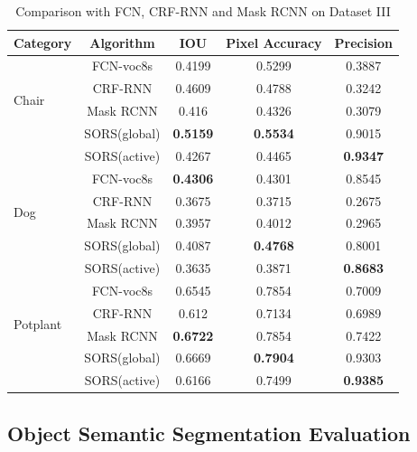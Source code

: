 \documentclass[conference]{IEEEtran}
\begin{document}
\begin{table}[htb]
	\centering
	\normalsize
	\caption{ {\color{blue}Comparison with FCN, CRF-RNN and Mask RCNN on Dataset III}}
	\label{t4}
	\begin{tabular}{lcccc}
		\hline
		Category& Algorithm& IOU& Pixel Accuracy& Precision \\
		\hline
		\multirow {4}{3cm}{Chair}&FCN-voc8s&0.4199&0.5299&0.3887\\
		
		&CRF-RNN&0.4609&0.4788&0.3242\\
		&{\color{blue}Mask RCNN}&{\color{blue}0.416}&{\color{blue} 0.4326} &{\color{blue} 0.3079}  \\
		
		&SORS(global)&\textbf{0.5159}&\textbf{0.5534}&0.9015\\
		
		&SORS(active)&0.4267&0.4465&\textbf{0.9347}\\
		\cline{1-5}
		\multirow {4}{3cm}{Dog}&FCN-voc8s&\textbf{0.4306}&0.4301&0.8545\\
		
		&CRF-RNN&0.3675&0.3715&0.2675\\
		&{\color{blue}Mask RCNN}&{\color{blue}0.3957}&{\color{blue} 0.4012} &{\color{blue} 0.2965}  \\
		&SORS(global)&0.4087&\textbf{0.4768}&0.8001\\
		
		&SORS(active)&0.3635&0.3871&\textbf{0.8683}\\
		\cline{1-5}
		\multirow {4}{3cm}{Potplant}&FCN-voc8s&0.6545&0.7854&0.7009\\
		
		&CRF-RNN&0.612&0.7134&0.6989\\
		&{\color{blue}Mask RCNN}&{\color{blue}\textbf{0.6722}}&{\color{blue} 0.7854} &{\color{blue} 0.7422}  \\
		
		&SORS(global)&0.6669&\textbf{0.7904}&0.9303\\
		
		&SORS(active)&0.6166&0.7499&\textbf{0.9385}\\
		\cline{1-5}
	\end{tabular}
\end{table}





\subsection{\textbf{Object Semantic Segmentation Evaluation}}
\end{document}
